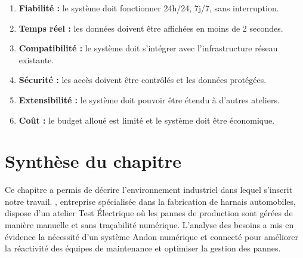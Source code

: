 \begin{enumerate}
    \item \textbf{Fiabilit\'e :} le syst\`eme doit fonctionner 24h/24, 7j/7, sans interruption.
    \item \textbf{Temps r\'eel :} les donn\'ees doivent \^etre affich\'ees en moins de 2 secondes.
    \item \textbf{Compatibilit\'e :} le syst\`eme doit s'int\'egrer avec l'infrastructure r\'eseau existante.
    \item \textbf{S\'ecurit\'e :} les acc\`es doivent \^etre contr\^ol\'es et les donn\'ees prot\'eg\'ees.
    \item \textbf{Extensibilit\'e :} le syst\`eme doit pouvoir \^etre \'etendu \`a d'autres ateliers.
    \item \textbf{Co\^ut :} le budget allou\'e est limit\'e et le syst\`eme doit \^etre \'economique.
\end{enumerate}

\section{Synth\`ese du chapitre}

Ce chapitre a permis de d\'ecrire l'environnement industriel dans lequel s'inscrit notre travail. \sews, entreprise sp\'ecialis\'ee dans la fabrication de harnais automobiles, dispose d'un atelier Test \'Electrique o\`u les pannes de production sont g\'er\'ees de mani\`ere manuelle et sans tra\c{c}abilit\'e num\'erique. L'analyse des besoins a mis en \'evidence la n\'ecessit\'e d'un syst\`eme Andon num\'erique et connect\'e pour am\'eliorer la r\'eactivit\'e des \'equipes de maintenance et optimiser la gestion des pannes.
